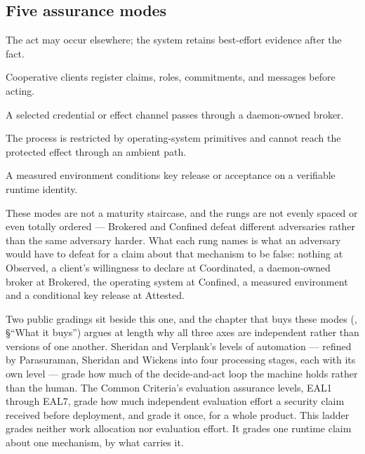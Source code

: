 \subsection{Five assurance modes}
\begin{description}[leftmargin=1.4em,itemsep=3pt]
  \item[Observed] The act may occur elsewhere; the system retains best-effort
  evidence after the fact.
  \item[Coordinated] Cooperative clients register claims, roles, commitments,
  and messages before acting.
  \item[Brokered] A selected credential or effect channel passes through a
  daemon-owned broker.
  \item[Confined] The process is restricted by operating-system primitives and
  cannot reach the protected effect through an ambient path.
  \item[Attested] A measured environment conditions key release or acceptance
  on a verifiable runtime identity.
\end{description}

These modes are not a maturity staircase, and the rungs are not evenly spaced or
even totally ordered --- Brokered and Confined defeat different adversaries
rather than the same adversary harder. What each rung names is what an adversary
would have to defeat for a claim about that mechanism to be false: nothing at
Observed, a client's willingness to declare at Coordinated, a daemon-owned
broker at Brokered, the operating system at Confined, a measured environment and
a conditional key release at Attested.

Two public gradings sit beside this one, and the chapter that buys these modes
(, \S``What it buys'') argues at length
why all three axes are independent rather than versions of one another.
Sheridan and Verplank's levels of automation --- refined by Parasuraman,
Sheridan and Wickens into four processing stages, each with its own level ---
grade how much of the decide-and-act loop the machine holds rather than the
human. The Common Criteria's evaluation assurance levels, EAL1 through EAL7,
grade how much independent evaluation effort a security claim received before
deployment, and grade it once, for a whole product. This ladder grades neither
work allocation nor evaluation effort. It grades one runtime claim about one
mechanism, by what carries it.

